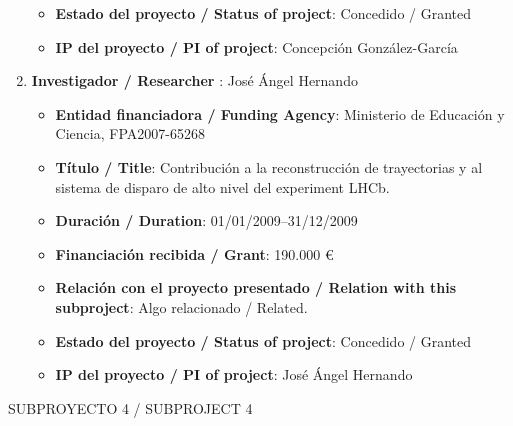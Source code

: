\begin{enumerate}
\begin{itemize}
\item {\bf Estado del proyecto / Status of project}: Concedido / Granted
\item {\bf IP del proyecto / PI of project}: Concepción González-García 
\end{itemize}
\item {\bf Investigador / Researcher }: José Ángel Hernando
\begin{itemize}
\item {\bf Entidad financiadora / Funding Agency}: Ministerio de Educaci\'on y Ciencia, FPA2007-65268
\item {\bf Título / Title}:  Contribuci\'on a la reconstrucci\'on de trayectorias y al sistema de disparo de alto nivel del experiment LHCb.
\item {\bf Duración / Duration}: 01/01/2009--31/12/2009
\item {\bf Financiación recibida / Grant}: 190.000 \euro 
\item {\bf Relación con el proyecto presentado / Relation with this subproject}: Algo relacionado / Related. 
\item {\bf Estado del proyecto / Status of project}: Concedido / Granted
\item {\bf IP del proyecto / PI of project}: José Ángel Hernando
\end{itemize}
\end{enumerate}


{\sc SUBPROYECTO 4 / SUBPROJECT 4}

